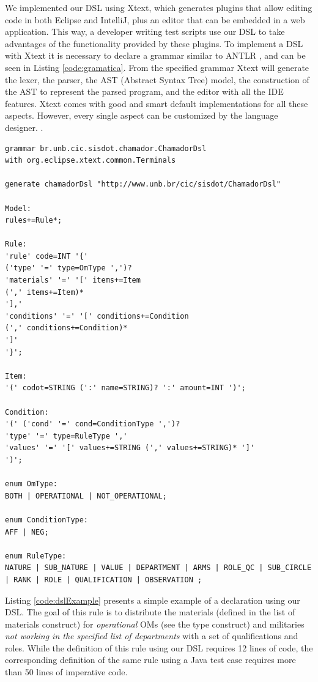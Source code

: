 We implemented our DSL using Xtext, which generates plugins that allow editing code in both Eclipse and IntelliJ{, \color{red}plus an editor that can be embedded in a web application}. This way, a developer writing test scripts use our DSL to take advantages of the functionality provided by these plugins.{\color{red} To implement a DSL with Xtext it is necessary to declare a grammar similar to ANTLR \cite{parr2013}, and can be seen in} Listing \ref{code:gramatica}. {\color{red} From the specified grammar Xtext will generate the lexer, the parser, the AST (Abstract Syntax Tree) model, the construction of the AST to represent the parsed program, and the editor with all the IDE features. Xtext comes with good and smart default implementations for all these aspects. However, every single aspect can be customized by the language designer. \cite{bettini2016}.}

\begin{lstlisting}[frame=single, language=Xtext, caption={\it Xtext grammar defining the DSL structure}, label={code:gramatica},basicstyle=\scriptsize]
grammar br.unb.cic.sisdot.chamador.ChamadorDsl 
with org.eclipse.xtext.common.Terminals

generate chamadorDsl "http://www.unb.br/cic/sisdot/ChamadorDsl"

Model:
rules+=Rule*;

Rule:
'rule' code=INT '{'
('type' '=' type=OmType ',')?
'materials' '=' '[' items+=Item
(',' items+=Item)*
'],'
'conditions' '=' '[' conditions+=Condition
(',' conditions+=Condition)*
']'
'}';

Item:
'(' codot=STRING (':' name=STRING)? ':' amount=INT ')';

Condition:
'(' ('cond' '=' cond=ConditionType ',')?
'type' '=' type=RuleType ','
'values' '=' '[' values+=STRING (',' values+=STRING)* ']'
')';

enum OmType:
BOTH | OPERATIONAL | NOT_OPERATIONAL;

enum ConditionType:
AFF | NEG;

enum RuleType:
NATURE | SUB_NATURE | VALUE | DEPARTMENT | ARMS | ROLE_QC | SUB_CIRCLE | RANK | ROLE | QUALIFICATION | OBSERVATION ;	\end{lstlisting}

Listing \ref{code:dslExample} presents a simple example of a \shc declaration using our DSL. 
The goal of this rule is to distribute 
the materials (defined in the list of materials construct) for \emph{operational} OMs (see the 
type construct) and militaries \emph{not working in the specified list of 
departments} with a set of qualifications and roles. While the definition of this rule 
using our DSL requires 12 lines of code, the corresponding definition of the same rule 
using a Java test case requires more than 50 lines of imperative code.

